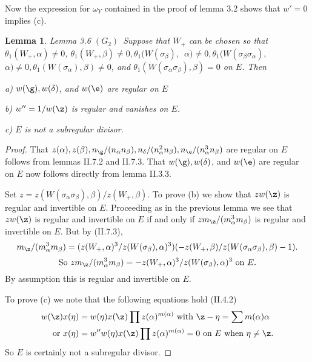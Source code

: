 \documentclass{memo-l}
\newtheorem{lemma}[theorem]{Lemma}
\theoremstyle{definition}
\theoremstyle{remark}
\numberwithin{section}{chapter}
\numberwithin{equation}{chapter}
\begin{document}
   Now the expression for ${\omega}_{Y}$ contained in the proof of lemma 3.2 
shows that $w' = 0$ implies (c).


{\medskip}

\begin{lemma}{Lemma 3.6}   $(G_{2})$\  Suppose that $W_{+}$ can be chosen so that 
${\theta}_{1}(W_{+},{\alpha})\ne 0$, ${\theta}_{1}(W_{+},{\beta})\ne 0, 
{\theta}_{1}(W({\sigma}_{\beta}),$\ ${\alpha})\ne 0, {\theta}_{1}
(W({\sigma}_{\beta}{\sigma}_{\alpha}),$\ ${\alpha})\ne 0, 
{\theta}_{1}(W({\sigma}_{\alpha}),{\beta})\ne 0$, and 
${\theta}_{1}(W({\sigma}_{\alpha}{\sigma}_{\beta}),{\beta}) = 0$ on $E$. 
 Then

\noindent
a)   $w({\g}), w({\delta})$, and $w({\e})$ are regular on $E$

\noindent
b)    $w'' = 1/w({\z})$ is regular and vanishes on $E$.

\noindent
c)   $E$ is not a subregular divisor.
\end{lemma}

\medskip

\begin{proof}    That $z({\alpha}), z({\beta}), n_{{\g}}/(n_{\alpha}
n_{\beta}), n_{{\delta}}/(n_{\alpha}^{2}n_{\beta}), 
n_{{\e}}/(n_{\alpha}^{3}n_{\beta})$ are regular on $E$ follows 
from lemmas II.7.2 and II.7.3. 
 That $w({\g}), w({\delta})$, and $w({\e})$ are regular on $E$ now 
follows directly from lemma II.3.3. 
 

   Set $z = z(W({\sigma}_{\alpha}{\sigma}_{\beta}),{\beta})/z(W_{+},{\beta})$. 
 To prove (b) we show that $zw({\z})$ is regular and invertible on $E$. 
 Proceeding as in the previous lemma we see that $zw({\z})$ is regular and 
invertible on $E$ if and only if $zm_{{\z}}/(m_{\alpha}^{3}m_{\beta})$ 
is regular and invertible on $E$. 
 But by (II.7.3),
$$
m_{{\z}}/(m_{\alpha}^{3}m_{\beta}) = 
(z(W_{+},{\alpha})^{3}/z(W({\sigma}_{\beta}),{\alpha})^{3})
(-z(W_{+},{\beta})/z(W({\sigma}_{\alpha}{\sigma}_{\beta}),{\beta}) - 1).
$$
$$
{\text{So}}\ zm_{{\z}}/(m_{\alpha}^{3}m_{\beta}) = 
-z(W_{+},{\alpha})^{3}/z(W({\sigma}_{\beta}),{\alpha})^{3}\ 
{\text{on}}\  E.
$$
By assumption this is regular and invertible on $E$.

   To prove (c) we note that the following equations hold (II.4.2)
$$
\aligned
w({\z})x({\eta}) &= w({\eta})x({\z}) \prod
z({\alpha})^{m({\alpha})}\  {\text{with}}\  {\z}-{\eta} = 
\sum m({\alpha}){\alpha} \\
{\text{or}}\  x({\eta}) &= w''w({\eta})x({\z}) \prod
z({\alpha})^{m({\alpha})} = 0\ {\text{on}}\ E\ {\text{when}}\ {\eta}\ne {\z}.
\endaligned
$$
So $E$ is certainly not a subregular divisor.
\end{proof}
\end{document}

